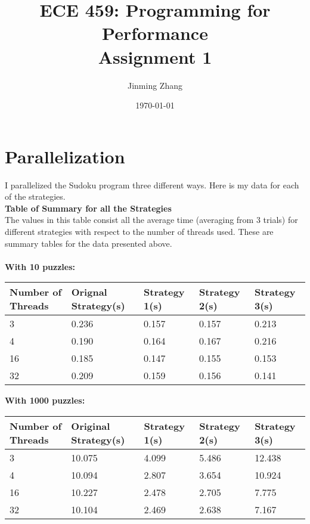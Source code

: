 \documentclass[12pt]{article}
\title{ECE 459: Programming for Performance\\Assignment 1}
\author{Jinming Zhang}
\date{\today}
\begin{document}
\maketitle

\section{Parallelization}
I parallelized the Sudoku program three different ways. Here is my data for each of the strategies. \\ 

\noindent
\textbf{Table of Summary for all the Strategies} \\
\indent
The values in this table consist all the average time (averaging from 3 trials) for different strategies with respect to the number of threads used. These are summary tables for the data presented above. \\ \\
\textbf{With 10 puzzles:} 
\begin{center}
    \begin{tabular}{ | l | l | l | l | l |}
    \hline
    Number of Threads & Orignal Strategy(s) & Strategy 1(s) & Strategy 2(s) & Strategy 3(s) \\ 
    \hline
    3 & 0.236 & 0.157 & 0.157 & 0.213 \\ 
    \hline
    4 & 0.190 & 0.164 & 0.167 & 0.216 \\ 
    \hline
    16 & 0.185 & 0.147 & 0.155 & 0.153 \\ 
    \hline
    32 & 0.209 & 0.159 & 0.156 & 0.141 \\ 
    \hline
    \end{tabular}
\end{center} 
\textbf{With 1000 puzzles:} 
\begin{center}
    \begin{tabular}{ | l | l | l | l | l |}
    \hline
    Number of Threads & Original Strategy(s) & Strategy 1(s) & Strategy 2(s) & Strategy 3(s) \\ 
    \hline
    3 & 10.075 & 4.099 & 5.486 & 12.438 \\ 
    \hline
    4 & 10.094 & 2.807 & 3.654 & 10.924 \\ 
    \hline
    16 & 10.227 & 2.478 & 2.705 & 7.775 \\ 
    \hline
    32 & 10.104 & 2.469 & 2.638 & 7.167\\ 
    \hline
    \end{tabular}
\end{center} 
\end{document}
